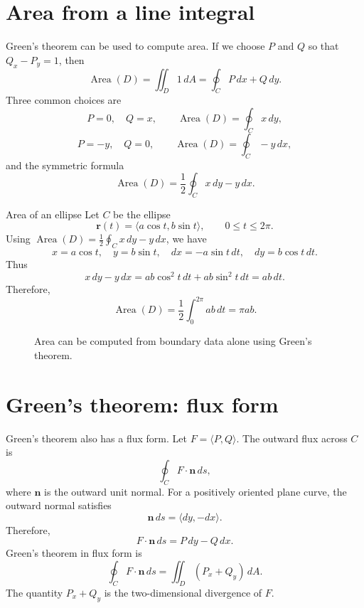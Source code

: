 \documentclass[11pt,oneside]{book}
\newcommand{\vect}[1]{\mathbf{#1}}
\begin{document}
\section{Area from a line integral}

Green's theorem can be used to compute area. If we choose $P$ and $Q$ so that $Q_x-P_y=1$, then
\[
\operatorname{Area}(D)=\iint_D 1\,dA=\oint_C P\,dx+Q\,dy.
\]
Three common choices are
\[
P=0,\quad Q=x,\qquad \operatorname{Area}(D)=\oint_C x\,dy,
\]
\[
P=-y,\quad Q=0,\qquad \operatorname{Area}(D)=\oint_C -y\,dx,
\]
and the symmetric formula
\[
\operatorname{Area}(D)=\frac12\oint_C x\,dy-y\,dx.
\]

\begin{examplebox}{Area of an ellipse}
Let $C$ be the ellipse
\[
\vect r(t)=\langle a\cos t,b\sin t\rangle,\qquad 0\le t\le 2\pi.
\]
Using $\operatorname{Area}(D)=\frac12\oint_C x\,dy-y\,dx$, we have
\[
x=a\cos t,\quad y=b\sin t,\quad dx=-a\sin t\,dt,\quad dy=b\cos t\,dt.
\]
Thus
\[
x\,dy-y\,dx=ab\cos^2 t\,dt+ab\sin^2 t\,dt=ab\,dt.
\]
Therefore,
\[
\operatorname{Area}(D)=\frac12\int_0^{2\pi}ab\,dt=\pi ab.
\]
\end{examplebox}

\begin{figure}[H]
\centering
{}
\caption{Area can be computed from boundary data alone using Green's theorem.}
\end{figure}

\section{Green's theorem: flux form}

Green's theorem also has a flux form. Let $F=\langle P,Q\rangle$. The outward flux across $C$ is
\[
\oint_C F\cdot \vect n\,ds,
\]
where $\vect n$ is the outward unit normal. For a positively oriented plane curve, the outward normal satisfies
\[
\vect n\,ds=\langle dy,-dx\rangle.
\]
Therefore,
\[
F\cdot \vect n\,ds=P\,dy-Q\,dx.
\]
Green's theorem in flux form is
\[
\oint_C F\cdot \vect n\,ds
=\iint_D(P_x+Q_y)\,dA.
\]
The quantity $P_x+Q_y$ is the two-dimensional divergence of $F$.
\end{document}
